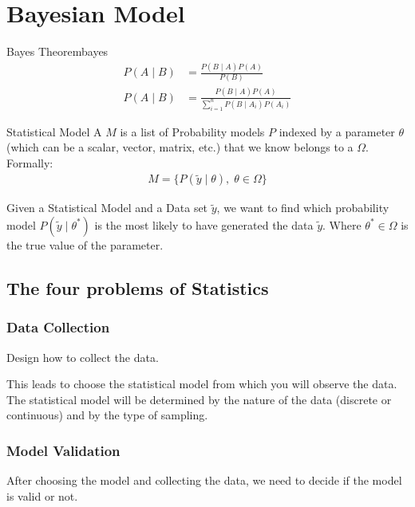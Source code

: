 
\section{Bayesian Model}

\begin{theorem}{Bayes Theorem}{bayes}
	\begin{align}
		P(A \mid B) & = \frac{P(B \mid A)P(A)}{P(B)}                             \\
		P(A \mid B) & = \frac{P(B \mid A)P(A)}{\sum_{i=1}^n P(B \mid A_i)P(A_i)}
	\end{align}
\end{theorem}

\begin{definition}{Statistical Model}{}
	A  $M$ is a list of Probability models $P$ indexed by
	a parameter $\theta$ (which can be a scalar, vector, matrix, etc.) that
	we know belongs to a  $\Omega$.
	\\[1em]
	Formally:
	\begin{align}
		M = \{ P(\tilde{y}\mid\theta), \; \theta \in \Omega \}
	\end{align}
\end{definition}

Given a Statistical Model and a Data set $\tilde{y}$, we want to find
which probability model $P(\tilde{y}\mid\theta^*)$ is the most likely to
have generated the data $\tilde{y}$. Where $\theta^* \in \Omega$ is the true
value of the parameter.

\subsection{The four problems of Statistics}
\subsubsection{Data Collection}
Design how to collect the data.

This leads to choose the statistical model from which you will observe the data.
The statistical model will be determined by the nature of the data
(discrete or continuous) and by the type of sampling.

\subsubsection{Model Validation}

After choosing the model and collecting the data, we need to decide if
the model is valid or not.

